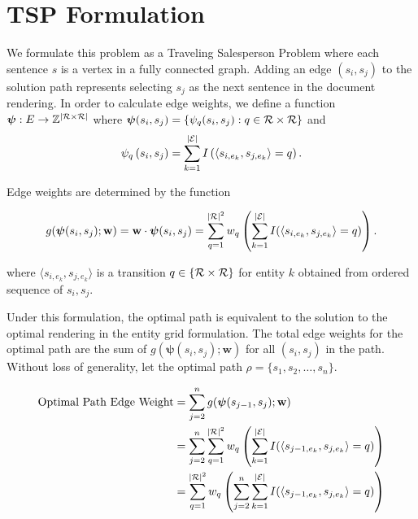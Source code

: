 \documentclass{article}
\newcommand{\entities}{{\cal E}}
\newcommand{\ent}{e}
\newcommand{\roles}{{\cal R}}
\newcommand{\tv}{t}
\newcommand{\sent}{s}
\newcommand{\weight}{\mathbf{w}}
\newcommand{\rend}{\rho}
\newcommand{\trans}{q}
\newcommand{\edgeTot}{\boldsymbol{\psi}}
\begin{document}
\section{TSP Formulation}
We formulate this problem as a Traveling Salesperson Problem where each sentence $\sent$ is a vertex in a fully connected graph. 
Adding an edge $(\sent_i,\sent_j)$ to the solution path represents selecting $\sent_j$ as the next sentence in the document rendering.
In order to calculate edge weights, we define a function $\edgeTot : E \rightarrow \mathbb{Z}^{|\roles \times \roles|}  $ where $\edgeTot(s_i,s_j) = \{ \psi_\trans(s_i,s_j) : \trans \in {\roles \times \roles } \}$ and 
\begin{equation}
    \psi_\trans\left( s_i,s_j \right) = \displaystyle \sum_{k=1}^{|\entities|} I\left( \langle s_{i,\ent_k},s_{j,\ent_k} \rangle = \trans\right) . 
\end{equation}

Edge weights are determined by the function

\begin{equation}
    g(\edgeTot(\sent_i,\sent_j );\weight) = \weight\cdot \edgeTot(\sent_i, \sent_j) = \sum^{|\roles|^2}_{q=1} w_\trans \left( \sum_{k = 1}^{|\entities|} I(\langle \sent_{i,\ent_k},\sent_{j,\ent_k}\rangle = \trans) \right).
\end{equation}

where $\langle \sent_{i,\ent_k},\sent_{j,\ent_k} \rangle$ is a transition $q \in \{\roles \times \roles\}$ for entity $k$  obtained from ordered sequence of $\sent_i,\sent_j$.


Under this formulation, the optimal path is equivalent to the solution to the optimal rendering in the entity grid formulation. 
The total edge weights for the optimal path are the sum of $g(\edgeTot(\sent_i,\sent_j);\weight)$ for all $(\sent_i,\sent_j)$ in the path.
Without loss of generality, let the optimal path $\rend = \{ \sent_1,\sent_2,\ldots,\sent_n \}$.

\begin{equation*}
\begin{split}
\textrm{Optimal Path Edge Weight} &= \sum^{n}_{j=2} g(\edgeTot(\sent_{j-1},\sent_j );\weight) \\
& = \sum^n_{j=2} \sum^{|\roles|^2}_{\trans=1} w_\trans \left( \sum_{k = 1}^{|\entities|} I(\langle \sent_{j-1,\ent_k},\sent_{j,\ent_k}\rangle = \trans)  \right)\\
& = \sum^{|\roles|^2}_{\trans=1} w_\trans \left( \sum^n_{j=2}  \sum_{k = 1}^{|\entities|} I(\langle \sent_{j-1,\ent_k},\sent_{j,\ent_k}\rangle = \trans)  \right)\\
\end{split}
\end{equation*}
\end{document}
